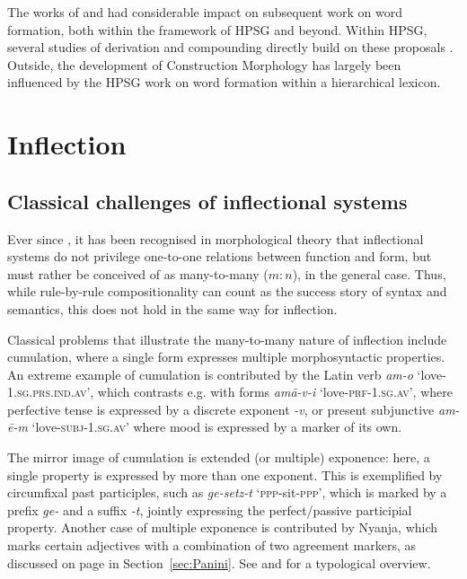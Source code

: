 \documentclass[output=paper
	        ,collection
	        ,collectionchapter
 	        ,biblatex
                ,babelshorthands
                ,newtxmath
                ,draftmode
                ,colorlinks, citecolor=brown
]{langscibook}
\begin{document}
The works of \citet{Riehemann98} and \cite{Koenig99} had considerable
impact on subsequent work on word formation, both within the framework 
of HPSG and beyond. Within HPSG, several studies of  derivation
and compounding directly build on these proposals \citep[e.g.][]{Tribout10,Desmets09}. 
Outside, the development of Construction Morphology
\citep{Booij10} has largely been influenced by the HPSG work on word
formation within a hierarchical lexicon. 

\section{Inflection}
\label{sec:Infl}\label{sec:inflection}

\subsection{Classical challenges of inflectional systems}
\label{sec:InflChallenges}

Ever since \citet{Matthews72}, it has been recognised in morphological
theory that inflectional systems do not privilege one-to-one relations
between function and form, but must rather be conceived of as
many-to-many ($m:n$), in the general case. Thus, while
rule-by-rule compositionality can count as the success story
of syntax and semantics, this does not hold in the same way for inflection. 

Classical problems that illustrate the many-to-many nature of
inflection include cumulation, where a single form expresses multiple
morphosyntactic properties. An extreme example of cumulation is
contributed by the Latin verb \textit{am-o}
`love-1.\textsc{sg}.\textsc{prs}.\textsc{ind}.\textsc{av}', which
contrasts e.g. with forms \textit{amā-v-i}
`love-\textsc{prf}-\textsc{1.sg.av}', where perfective tense is
expressed by a discrete exponent \textit{-v}, or present subjunctive
\textit{am-ē-m} `love-\textsc{subj}-\textsc{1.sg.av}' where mood is
expressed by a marker of its own.

The mirror image of cumulation is extended (or multiple) exponence:
here, a single property is expressed by more than one exponent. This
is exemplified by  circumfixal past participles, such as
\textit{ge-setz-t} `\textsc{ppp}-sit-\textsc{ppp}', which is
 marked by a prefix \textit{ge-} and a suffix \textit{-t},
jointly expressing the perfect/passive participial property. Another
case of multiple exponence is contributed by Nyanja, which marks
certain adjectives with a combination of two agreement markers, as
discussed on page \pageref{Nyanja} in
Section~\ref{sec:Panini}.  See
\citet{caballero_g-harris_a12} and \citet{Harris17} for a typological overview. 
\end{document}
